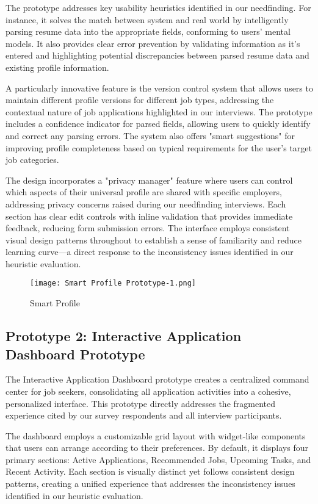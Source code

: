 \documentclass[
	letterpaper, %
]{jdf}
\begin{document}
The prototype addresses key usability heuristics identified in our needfinding. For instance, it solves the match between system and real world by intelligently parsing resume data into the appropriate fields, conforming to users' mental models. It also provides clear error prevention by validating information as it's entered and highlighting potential discrepancies between parsed resume data and existing profile information.

A particularly innovative feature is the version control system that allows users to maintain different profile versions for different job types, addressing the contextual nature of job applications highlighted in our interviews. The prototype includes a confidence indicator for parsed fields, allowing users to quickly identify and correct any parsing errors. The system also offers "smart suggestions" for improving profile completeness based on typical requirements for the user's target job categories.

The design incorporates a "privacy manager" feature where users can control which aspects of their universal profile are shared with specific employers, addressing privacy concerns raised during our needfinding interviews. Each section has clear edit controls with inline validation that provides immediate feedback, reducing form submission errors. The interface employs consistent visual design patterns throughout to establish a sense of familiarity and reduce learning curve—a direct response to the inconsistency issues identified in our heuristic evaluation.

\begin{figure}
    \centering
    \texttt{[image: Smart Profile Prototype-1.png]}
    \caption{Smart Profile}
    \label{fig:enter-label}
\end{figure}

\newpage

\subsection{Prototype 2: Interactive Application Dashboard Prototype}
The Interactive Application Dashboard prototype creates a centralized command center for job seekers, consolidating all application activities into a cohesive, personalized interface. This prototype directly addresses the fragmented experience cited by our survey respondents and all interview participants.

The dashboard employs a customizable grid layout with widget-like components that users can arrange according to their preferences. By default, it displays four primary sections: Active Applications, Recommended Jobs, Upcoming Tasks, and Recent Activity. Each section is visually distinct yet follows consistent design patterns, creating a unified experience that addresses the inconsistency issues identified in our heuristic evaluation.
\end{document}
